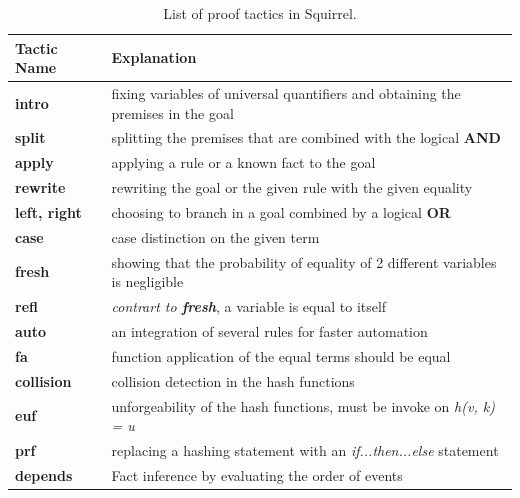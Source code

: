 \documentclass[conference]{IEEEtran}
\begin{document}
\begin{table}
\begin{tabular}{ ||p{1.5cm}|p{6cm}|| }
     \hline
      Tactic Name & Explanation\\
     \hline
     \rowcolor{gray!30}
     \textbf{intro} & fixing variables of universal quantifiers and obtaining the premises in the goal\\
     \textbf{split} & splitting the premises that are combined with the logical \textbf{AND}\\
     \rowcolor{gray!30}
     \textbf{apply} & applying a rule or a known fact to the goal\\
     \textbf{rewrite} & rewriting the goal or the given rule with the given equality\\
     \rowcolor{gray!30}
     \textbf{left, right} & choosing to branch in a goal combined by a logical \textbf{OR}\\
     \textbf{case} & case distinction on the given term\\
     \rowcolor{gray!30}
     \textbf{fresh} & showing that the probability of equality of 2 different variables is negligible\\
     \textbf{refl} & \textit{contrart to \textbf{fresh}}, a variable is equal to itself\\
     \rowcolor{gray!30}
     \textbf{auto} & an integration of several rules for faster automation\\
     \textbf{fa} & function application of the equal terms should be equal\\
     \rowcolor{gray!30}
     \textbf{collision} & collision detection in the hash functions\\
     \textbf{euf} & unforgeability of the hash functions, must be invoke on \textit{h(v, k) = u}\\
     \rowcolor{gray!30}
     \textbf{prf} & replacing a hashing statement with an \textit{if...then...else} statement\\
     \textbf{depends} & Fact inference by evaluating the order of events\\
     \hline
\end{tabular}
\label{table:4}
\\[10pt]
\caption{List of proof tactics in Squirrel.}
\end{table}
\end{document}
